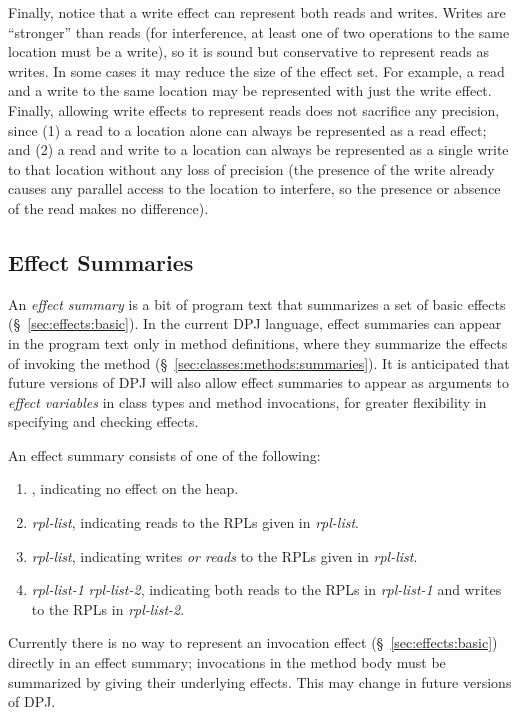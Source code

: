 Finally, notice that a write effect can represent both reads and
writes.  Writes are ``stronger'' than reads (for interference, at
least one of two operations to the same location must be a write), so
it is sound but conservative to represent reads as writes.  In some
cases it may reduce the size of the effect set.  For example, a read
and a write to the same location may be represented with just the
write effect.  Finally, allowing write effects to represent reads does
not sacrifice any precision, since (1) a read to a location alone can
always be represented as a read effect; and (2) a read and write to a
location can always be represented as a single write to that location
without any loss of precision (the presence of the write already
causes any parallel access to the location to interfere, so the
presence or absence of the read makes no difference).

\subsection{Effect Summaries%
\label{sec:effects:summaries}}

An \emph{effect summary} is a bit of program text that summarizes a
set of basic effects (\S~\ref{sec:effects:basic}).  In the current DPJ
language, effect summaries can appear in the program text only in
method definitions, where they summarize the effects of invoking the
method (\S~\ref{sec:classes:methods:summaries}).  It is anticipated
that future versions of DPJ will also allow effect summaries to appear
as arguments to \emph{effect variables} in class types and method
invocations, for greater flexibility in specifying and checking
effects.

An effect summary consists of one of the following:
%
\begin{enumerate}
%
\item {}, indicating no effect on the heap.
%
\item {} \emph{rpl-list}, indicating reads to the RPLs given
  in \emph{rpl-list}.
%
\item {} \emph{rpl-list}, indicating writes \emph{or reads}
  to the RPLs given in \emph{rpl-list}.  
%
\item {} \emph{rpl-list-1}  \emph{rpl-list-2},
  indicating both reads to the RPLs in \emph{rpl-list-1} and writes to
  the RPLs in \emph{rpl-list-2}.
%
\end{enumerate}
%
Currently there is no way to represent an invocation effect
(\S~\ref{sec:effects:basic}) directly in an effect summary;
invocations in the method body must be summarized by giving their
underlying effects.  This may change in future versions of DPJ.

